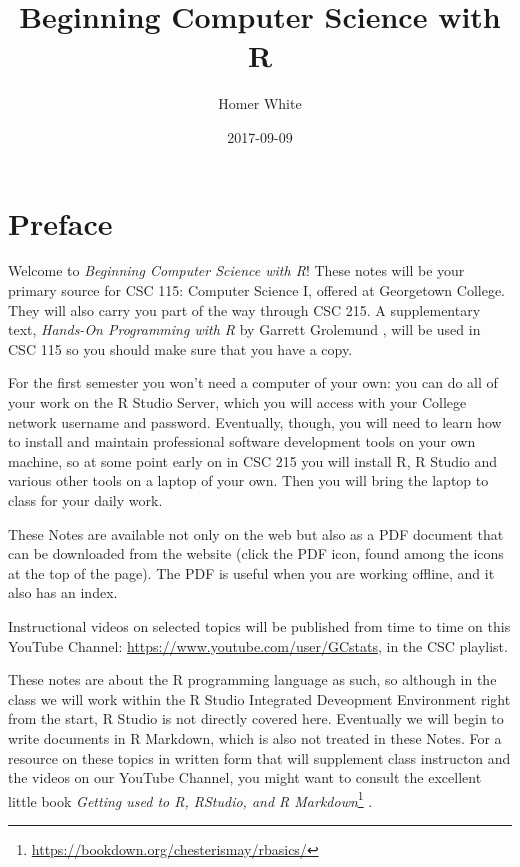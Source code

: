 \documentclass[]{book}
\title{Beginning Computer Science with R}
\author{Homer White}
\date{2017-09-09}
\let\rmarkdownfootnote\footnote%
\def\footnote{\protect\rmarkdownfootnote}
\renewcommand{\href}[2]{#2\footnote{\url{#1}}}
\renewcommand{\href}[2]{#2\footnote{\url{#1}}}
\theoremstyle{definition}
\theoremstyle{definition}
\theoremstyle{definition}
\theoremstyle{remark}
\begin{document}
\maketitle

{
\setcounter{tocdepth}{1}
\tableofcontents
}
\chapter*{Preface}\label{preface}

Welcome to \emph{Beginning Computer Science with R}! These notes will be
your primary source for CSC 115: Computer Science I, offered at
Georgetown College. They will also carry you part of the way through CSC
215. A supplementary text, \emph{Hands-On Programming with R} by Garrett
Grolemund \citep{Grolemund2014}, will be used in CSC 115 so you should
make sure that you have a copy.

For the first semester you won't need a computer of your own: you can do
all of your work on the R Studio Server, which you will access with your
College network username and password. Eventually, though, you will need
to learn how to install and maintain professional software development
tools on your own machine, so at some point early on in CSC 215 you will
install R, R Studio and various other tools on a laptop of your own.
Then you will bring the laptop to class for your daily work.

These Notes are available not only on the web but also as a PDF document
that can be downloaded from the website (click the PDF icon, found among
the icons at the top of the page). The PDF is useful when you are
working offline, and it also has an index.

Instructional videos on selected topics will be published from time to
time on this YouTube Channel:
\url{https://www.youtube.com/user/GCstats}, in the CSC playlist.

These notes are about the R programming language as such, so although in
the class we will work within the R Studio Integrated Deveopment
Environment right from the start, R Studio is not directly covered here.
Eventually we will begin to write documents in R Markdown, which is also
not treated in these Notes. For a resource on these topics in written
form that will supplement class instructon and the videos on our YouTube
Channel, you might want to consult the excellent little book
\href{https://bookdown.org/chesterismay/rbasics/}{\emph{Getting used to
R, RStudio, and R Markdown}} \citep{Ismay2016}.
\end{document}
